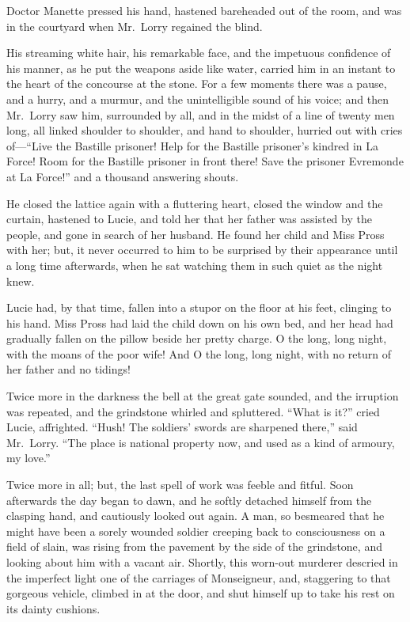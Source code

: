 Doctor Manette pressed his hand, hastened bareheaded out of the room,
and was in the courtyard when Mr.\ Lorry regained the blind.

His streaming white hair, his remarkable face, and the impetuous
confidence of his manner, as he put the weapons aside like water,
carried him in an instant to the heart of the concourse at the stone.
For a few moments there was a pause, and a hurry, and a murmur, and
the unintelligible sound of his voice; and then Mr.\ Lorry saw him,
surrounded by all, and in the midst of a line of twenty men long, all
linked shoulder to shoulder, and hand to shoulder, hurried out with
cries of---``Live the Bastille prisoner!  Help for the Bastille
prisoner's kindred in La Force!  Room for the Bastille prisoner in
front there!  Save the prisoner Evremonde at La Force!'' and a thousand
answering shouts.

He closed the lattice again with a fluttering heart, closed the
window and the curtain, hastened to Lucie, and told her that her
father was assisted by the people, and gone in search of her husband.
He found her child and Miss Pross with her; but, it never occurred to
him to be surprised by their appearance until a long time afterwards,
when he sat watching them in such quiet as the night knew.

Lucie had, by that time, fallen into a stupor on the floor at his feet,
clinging to his hand.  Miss Pross had laid the child down on his own bed,
and her head had gradually fallen on the pillow beside her pretty charge.
O the long, long night, with the moans of the poor wife!  And O the long,
long night, with no return of her father and no tidings!

Twice more in the darkness the bell at the great gate sounded,
and the irruption was repeated, and the grindstone whirled and
spluttered.  ``What is it?'' cried Lucie, affrighted.  ``Hush! The
soldiers' swords are sharpened there,'' said Mr.\ Lorry.  ``The place
is national property now, and used as a kind of armoury, my love.''

Twice more in all; but, the last spell of work was feeble and fitful.
Soon afterwards the day began to dawn, and he softly detached himself
from the clasping hand, and cautiously looked out again.  A man, so
besmeared that he might have been a sorely wounded soldier creeping
back to consciousness on a field of slain, was rising from the
pavement by the side of the grindstone, and looking about him with a
vacant air.  Shortly, this worn-out murderer descried in the imperfect
light one of the carriages of Monseigneur, and, staggering to that
gorgeous vehicle, climbed in at the door, and shut himself up to take
his rest on its dainty cushions.

